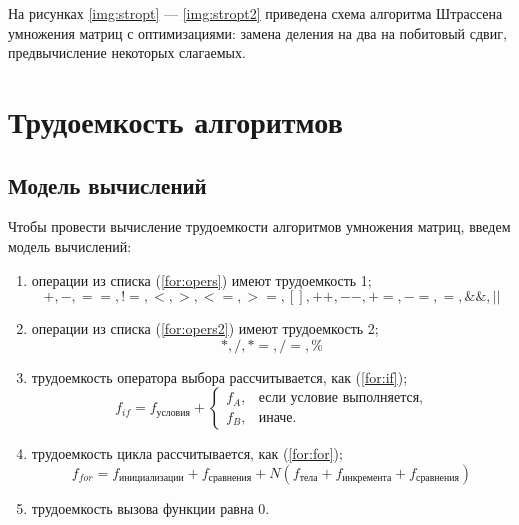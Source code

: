 На рисунках \ref{img:stropt} --- \ref{img:stropt2} приведена схема алгоритма Штрассена умножения матриц с оптимизациями: замена деления на два на побитовый сдвиг, предвычисление некоторых слагаемых.



\pagebreak

\section{Трудоемкость алгоритмов}

\subsection{Модель вычислений}

Чтобы провести вычисление трудоемкости алгоритмов умножения матриц, введем модель вычислений:

\begin{enumerate}
	\item операции из списка (\ref{for:opers}) имеют трудоемкость 1;
	\begin{equation}
		\label{for:opers}
		+, -, ==, !=, <, >, <=, >=, [], ++, {-}-, +=, -=, =, \&\&, ||
	\end{equation}
	\item операции из списка (\ref{for:opers2}) имеют трудоемкость 2;
	\begin{equation}
		\label{for:opers2}
		*, /, *=, /=, \%
	\end{equation}
	\item трудоемкость оператора выбора  рассчитывается, как (\ref{for:if});
	\begin{equation}
		\label{for:if}
		f_{if} = f_{\text{условия}} +
		\begin{cases}
			f_A, & \text{если условие выполняется,}\\
			f_B, & \text{иначе.}
		\end{cases}
	\end{equation}
	\item трудоемкость цикла рассчитывается, как (\ref{for:for});
	\begin{equation}
		\label{for:for}
		f_{for} = f_{\text{инициализации}} + f_{\text{сравнения}} + N(f_{\text{тела}} + f_{\text{инкремента}} + f_{\text{сравнения}})
	\end{equation}
	\item трудоемкость вызова функции равна 0.
\end{enumerate}

